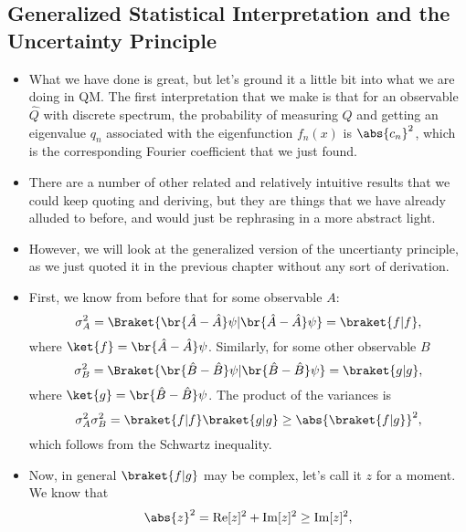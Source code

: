 \subsection*{Generalized Statistical Interpretation and the Uncertainty Principle}

\begin{itemize}
    \item What we have done is great, but let's ground it a little bit into what we are doing in QM. The first interpretation that we make is that for an observable $\hat{Q}$ with discrete spectrum, the probability of measuring $Q$ and getting an eigenvalue $q_n$ associated with the eigenfunction $f_n(x)$ is $\abs{c_n}^2$, which is the corresponding Fourier coefficient that we just found.
    \item There are a number of other related and relatively intuitive results that we could keep quoting and deriving, but they are things that we have already alluded to before, and would just be rephrasing in a more abstract light. 
    \item However, we will look at the generalized version of the uncertianty principle, as we just quoted it in the previous chapter without any sort of derivation.
    \item First, we know from before that for some observable $A$:
        \begin{equation*}
            \sigma_A^2 = \Braket{\br{\hat{A} - \hat{A}} \psi | \br{\hat{A} - \hat{A}} \psi} = \braket{f|f},
        \end{equation*}
        where $\ket{f} = \br{\hat{A} - \hat{A}} \psi$. Similarly, for some other observable $B$
        \begin{equation*}
            \sigma_B^2 = \Braket{\br{\hat{B} - \hat{B}} \psi | \br{\hat{B} - \hat{B}} \psi} = \braket{g|g},
        \end{equation*}
        where $\ket{g} = \br{\hat{B} - \hat{B}} \psi$. The product of the variances is
        \begin{equation*}
            \sigma_A^2\sigma_B^2 = \braket{f|f}\braket{g|g} \geq \abs{\braket{f|g}}^2,
        \end{equation*}
        which follows from the Schwartz inequality. 
    \item Now, in general $\braket{f|g}$ may be complex, let's call it $z$ for a moment. We know that 
        \begin{equation*}
            \abs{z}^2 = \mathrm{Re}[z]^2 + \mathrm{Im}[z]^2 \geq \mathrm{Im}[z]^2,
        \end{equation*}

\end{itemize}

